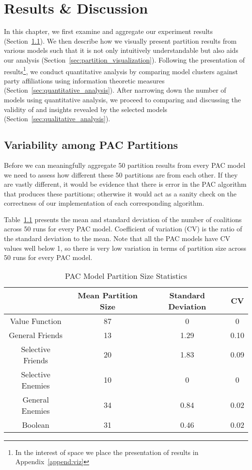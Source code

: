 
\chapter{Results \& Discussion}
\label{ch:analysis}

In this chapter, we first examine and aggregate our experiment results
(Section~\ref{sec:variability_among_pac_partitions}).
We then describe how we visually present partition results from various models
such that it is not only intuitively understandable but also aids our analysis
(Section~\ref{sec:partition_visualization}).
Following the presentation of results\footnote{In the interest of space we
place the presentation of results in Appendix~\ref{append:viz}}, we conduct
quantitative analysis by comparing model clusters against party affiliations
using information theoretic measures (Section~\ref{sec:quantitative_analysis}).
After narrowing down the number of models using quantitative analysis, we
proceed to comparing and discussing the validity of and insights revealed by
the selected models (Section~\ref{sec:qualitative_analysis}).


\section{Variability among PAC Partitions}
\label{sec:variability_among_pac_partitions}

Before we can meaningfully aggregate 50 partition results from every PAC model
we need to assess how different these 50 partitions are from each other.
If they are vastly different, it would be evidence that there is error in the
PAC algorithm that produces these partitions; otherwise it would act as a sanity
check on the correctness of our implementation of each corresponding algorithm.

Table~\ref{Analysis:table:pac_num_coalitions} presents the mean and standard
deviation of the number of coalitions across 50 runs for every PAC model.
Coefficient of variation (CV) is the ratio of the standard deviation to the mean.
Note that all the PAC models have CV values well below 1, so there is very low
variation in terms of partition size across 50 runs for every PAC model.

\begin{table}[h!]
\centering
\begin{tabular}{|c|c|c|c|}
\hline
       & Mean Partition Size & Standard Deviation & CV \\ \hline
Value Function & 87 & 0 & 0 \\
General Friends & 13 & 1.29 & 0.10  \\
Selective Friends & 20 & 1.83 & 0.09  \\
Selective Enemies & 10 & 0 & 0 \\
General Enemies & 34 & 0.84 & 0.02 \\
Boolean & 31 & 0.46 & 0.02  \\
\hline
\end{tabular}
\caption{PAC Model Partition Size Statistics}
\label{Analysis:table:pac_num_coalitions}
\end{table}

